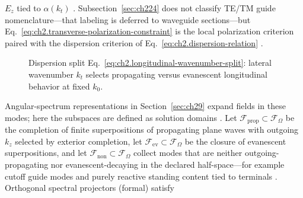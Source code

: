 \(E_z\) tied to \(\alpha(k_t)\) \cite{stratton1941}. Subsection~\ref{sec:ch224}
does not classify TE/TM guide nomenclature---that labeling is deferred to
waveguide sections---but Eq.~\eqref{eq:ch2.transverse-polarization-constraint}
is the local polarization criterion paired with the dispersion criterion of
Eq.~\eqref{eq:ch2.dispersion-relation} \cite{harrington2001}.
\begin{figure}[t]
\centering
{}
\caption{Dispersion split Eq.~\eqref{eq:ch2.longitudinal-wavenumber-split}: lateral
wavenumber \(k_t\) selects propagating versus evanescent longitudinal behavior at
fixed \(k_0\).}
\label{fig:ch2.propagating-evanescent-split}
\end{figure}
Angular-spectrum representations in
Section~\ref{sec:ch29} expand fields in these modes; here the subspaces are defined
as solution domains \cite{stratton1941}. Let \(\mathcal{F}_{\mathrm{prop}}\subset\mathcal{F}_\Omega\) be the completion of
finite superpositions of propagating plane waves with outgoing \(k_z\) selected by
exterior completion, let \(\mathcal{F}_{\mathrm{ev}}\subset\mathcal{F}_\Omega\) be the
closure of evanescent superpositions, and let
\(\mathcal{F}_{\mathrm{non}}\subset\mathcal{F}_\Omega\) collect modes that are
neither outgoing-propagating nor evanescent-decaying in the declared half-space---for
example cutoff guide modes and purely reactive standing content tied to terminals
\cite{stratton1941}. 
\label{sec:ch224}
Orthogonal spectral projectors (formal) satisfy

